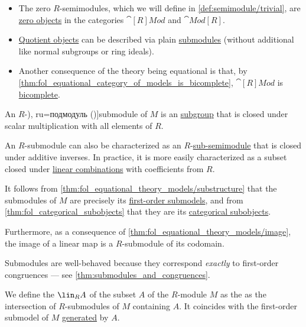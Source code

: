 \begin{definition}
\begin{thmenum}
\begin{itemize}
      \item The zero \( R \)-semimodules, which we will define in \cref{def:semimodule/trivial}, are \hyperref[def:universal_objects/zero]{zero objects} in the categories \( \cat[R]{Mod} \) and \( \cat{Mod}[R] \).

      \item \hyperref[def:categorical_quotient_object]{Quotient objects} can be described via plain \hyperref[def:module/subobject]{submodules} (without additional like normal subgroups or ring ideals).

      \item Another consequence of the theory being equational is that, by \cref{thm:fol_equational_category_of_models_is_bicomplete}, \( \cat[R]{Mod} \) is \hyperref[def:bicomplete_category]{bicomplete}.
    \end{itemize}

     An \( R \)-\term[bg=подмодул (\cite[239]{ГеновМиховскиМоллов1991Алгебра}), ru=подмодуль (\cite[396]{Винберг2014КурсАлгебры})]{submodule} of \( M \) is an \hyperref[def:group/subobject]{subgroup} that is closed under scalar multiplication with all elements of \( R \).

    An \( R \)-submodule can also be characterized as an \( R \)-\hyperref[def:semimodule/subobject]{sub-semimodule} that is closed under additive inverses. In practice, it is more easily characterized as a subset closed under \hyperref[def:linear_combination]{linear combinations} with coefficients from \( R \).

    It follows from \cref{thm:fol_equational_theory_models/substructure} that the submodules of \( M \) are precisely its \hyperref[def:fol_substructure/submodel]{first-order submodels}, and from \cref{thm:fol_categorical_subobjects} that they are its \hyperref[def:categorical_subobject]{categorical subobjects}.

    Furthermore, as a consequence of \cref{thm:fol_equational_theory_models/image}, the image of a linear map is a \( R \)-submodule of its codomain.

    Submodules are well-behaved because they correspond \emph{exactly} to first-order congruences --- see \cref{thm:submodules_and_congruences}.

     We define the  \( \lin_R A \) of the subset \( A \) of the \( R \)-module \( M \) as the as the intersection of \( R \)-submodules of \( M \) containing \( A \). It coincides with the first-order submodel of \( M \) \hyperref[def:fol_generated_substructure]{generated} by \( A \).


\end{thmenum}
\end{definition}
